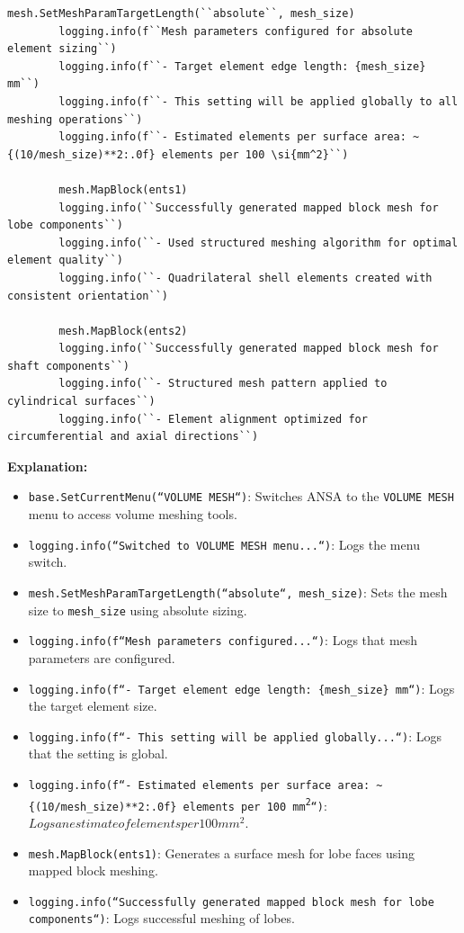 \documentclass{book}
\begin{document}
\begin{itemize}[leftmargin=*,label=\textbullet]
\begin{lstlisting}[caption={MeshProcessor Class - Meshing Setup and Surface Meshing},label={lst:meshprocessor_3}]
        mesh.SetMeshParamTargetLength(``absolute``, mesh_size)
        logging.info(f``Mesh parameters configured for absolute element sizing``)
        logging.info(f``- Target element edge length: {mesh_size} mm``)
        logging.info(f``- This setting will be applied globally to all meshing operations``)
        logging.info(f``- Estimated elements per surface area: ~{(10/mesh_size)**2:.0f} elements per 100 \si{mm^2}``)

        mesh.MapBlock(ents1)
        logging.info(``Successfully generated mapped block mesh for lobe components``)
        logging.info(``- Used structured meshing algorithm for optimal element quality``)
        logging.info(``- Quadrilateral shell elements created with consistent orientation``)

        mesh.MapBlock(ents2)
        logging.info(``Successfully generated mapped block mesh for shaft components``)
        logging.info(``- Structured mesh pattern applied to cylindrical surfaces``)
        logging.info(``- Element alignment optimized for circumferential and axial directions``)
\end{lstlisting}
\textbf{Explanation:}
\begin{itemize}
    \item \texttt{base.SetCurrentMenu(``VOLUME MESH``)}: Switches ANSA to the \texttt{VOLUME MESH} menu to access volume meshing tools.
    \item \texttt{logging.info(``Switched to VOLUME MESH menu...``)}: Logs the menu switch.
    \item \texttt{mesh.SetMeshParamTargetLength(``absolute``, mesh\_size)}: Sets the mesh size to \texttt{mesh\_size} using absolute sizing.
    \item \texttt{logging.info(f``Mesh parameters configured...``)}: Logs that mesh parameters are configured.
    \item \texttt{logging.info(f``- Target element edge length: \{mesh\_size\} mm``)}: Logs the target element size.
    \item \texttt{logging.info(f``- This setting will be applied globally...``)}: Logs that the setting is global.
    \item \texttt{logging.info(f``- Estimated elements per surface area: \textasciitilde\{(10/mesh\_size)**2:.0f\} elements per 100 \si{mm^2}``)}: $Logs an estimate of elements per 100 \si{mm^2}$.
    \item \texttt{mesh.MapBlock(ents1)}: Generates a surface mesh for lobe faces using mapped block meshing.
    \item \texttt{logging.info(``Successfully generated mapped block mesh for lobe components``)}: Logs successful meshing of lobes.

\end{itemize}
\end{itemize}
\end{document}

